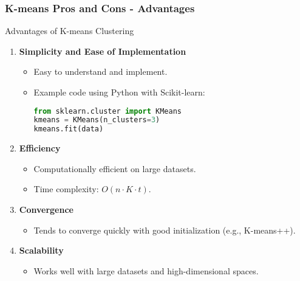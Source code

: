\documentclass[aspectratio=169]{beamer}
\begin{document}
\begin{frame}[fragile]
    \frametitle{K-means Pros and Cons - Advantages}
    \begin{block}{Advantages of K-means Clustering}
        \begin{enumerate}
            \item \textbf{Simplicity and Ease of Implementation}
                \begin{itemize}
                    \item Easy to understand and implement.
                    \item Example code using Python with Scikit-learn:
                    \begin{lstlisting}[language=Python]
from sklearn.cluster import KMeans
kmeans = KMeans(n_clusters=3)
kmeans.fit(data)
                    \end{lstlisting}
                \end{itemize}
            \item \textbf{Efficiency}
                \begin{itemize}
                    \item Computationally efficient on large datasets.
                    \item Time complexity: \(O(n \cdot K \cdot t)\).
                \end{itemize}
            \item \textbf{Convergence}
                \begin{itemize}
                    \item Tends to converge quickly with good initialization (e.g., K-means++).
                \end{itemize}
            \item \textbf{Scalability}
                \begin{itemize}
                    \item Works well with large datasets and high-dimensional spaces.
                \end{itemize}
        \end{enumerate}
    \end{block}
\end{frame}
\end{document}
